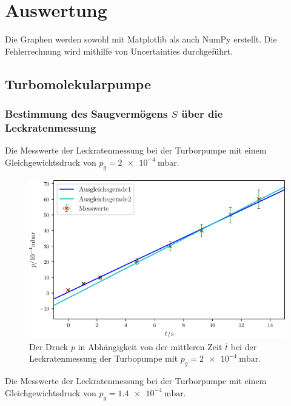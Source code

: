 \section{Auswertung}
\label{sec:Auswertung}

Die Graphen werden sowohl mit Matplotlib \cite{matplotlib} als auch NumPy \cite{numpy} erstellt. Die Fehlerrechnung wird mithilfe von Uncertainties \cite{uncertainties} durchgeführt.

\subsection{Turbomolekularpumpe}

\subsubsection{Bestimmung des Saugvermögens $S$ über die Leckratenmessung}

\begin{table}
\centering
\caption{Die Messwerte der Leckratenmessung bei der Turborpumpe mit einem Gleichgewichtsdruck von $p_g = \SI{2e-4}{\milli\bar}$.}

\label{tab:TL1}
\end{table}

\begin{figure}
\centering
\includegraphics[width=\linewidth-70pt,height=\textheight-70pt,keepaspectratio]{content/images/TL1.png}
\caption{Der Druck $p$ in Abhängigkeit von der mittleren Zeit $\bar{t}$ bei der Leckratenmessung der Turbopumpe  mit $p_g = \SI{2e-4}{\milli\bar}$.}
\label{fig:TL1}
\end{figure}

\begin{table}
\centering
\caption{Die Messwerte der Leckratenmessung bei der Turborpumpe mit einem Gleichgewichtsdruck von $p_g = \SI{1.4e-4}{\milli\bar}$.}

\label{tab:TL2}
\end{table}

